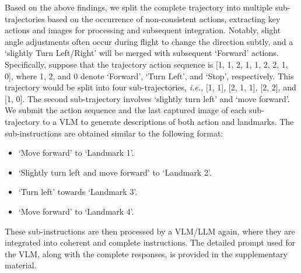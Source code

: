 Based on the above findings, we split the complete trajectory into multiple sub-trajectories based on the occurrence of non-consistent actions, extracting key actions and images for processing and subsequent integration. Notably, slight angle adjustments often occur during flight to change the direction subtly, and a `slightly Turn Left/Right' will be merged with subsequent `Forward' actions. Specifically, suppose that the trajectory action sequence is [1, 1, 2, 1, 1, 2, 2, 1, 0], where 1, 2, and 0 denote `Forward', `Turn Left', and `Stop', respectively. This trajectory would be split into four sub-trajectories, \emph{i.e.,} [1, 1], [2, 1, 1], [2, 2], and [1, 0]. The second sub-trajectory involves `slightly turn left' and `move forward'. We submit the action sequence and the last captured image of each sub-trajectory to a VLM to generate descriptions of both action and landmarks.
The sub-instructions are obtained similar to the following format:
\begin{itemize}[left=0pt]
    \item `Move forward' to `Landmark 1'.
    \item `Slightly turn left and move forward' to `Landmark 2'.
    \item `Turn left' towards `Landmark 3'.
    \item `Move forward' to `Landmark 4'.
\end{itemize}

These sub-instructions are then processed by a VLM/LLM again, where they are integrated into coherent and complete instructions. The detailed prompt used for the VLM, along with the complete responses, is provided in the supplementary material.



